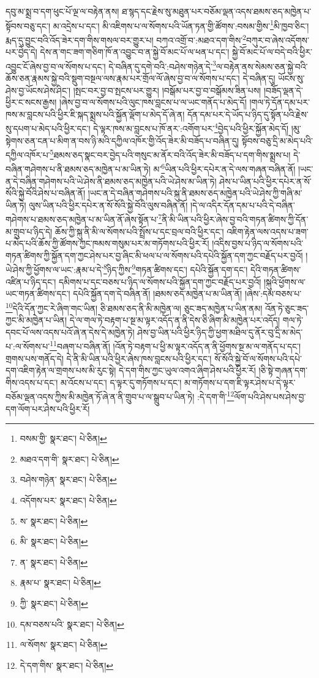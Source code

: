 དབུ་མ་སྨྲ་བ་དག་ཕུང་པོ་ལྔ་ལ་བརྟེན་ནས། ཐ་སྙད་དང་རྗེས་སུ་མཐུན་པར་བཅོམ་ལྡན་འདས་ཐམས་ཅད་མཁྱེན་པ་སྟོབས་བཅུ་དང་། མ་འདྲེས་པ་དང་། མི་འཇིགས་པ་ལ་སོགས་པའི་ཡོན་ཏན་གྱི་ཚོགས་:བསམ་གྱིས་\footnote{བསམ་གྱི་  སྣར་ཐང་།  པེ་ཅིན། }མི་ཁྱབ་ཅིང་། རྨད་དུ་བྱུང་བའི་འོད་ཟེར་དག་གིས་གསལ་བར་གྱུར་པ། བཀའ་འགྲོ་བ་:མཐའ་དག་གིས་\footnote{མཐའ་དག་གི་  སྣར་ཐང་།  པེ་ཅིན། }བཀུར་བ་ཞེས་འདོགས་པར་བྱེད་དེ། དེས་ན་གང་ཟག་གཅིག་ཁོ་ན་འབྱུང་བ་ན་སྐྱེ་བོ་མང་པོ་ལ་ཕན་པ་དང་། སྐྱེ་བོ་མང་པོ་ལ་བདེ་བའི་ཕྱིར་འབྱུང་ངོ་ཞེས་བྱ་བ་ལ་སོགས་པ་དང་། དེ་བཞིན་དུ་དགེ་བའི་:བཤེས་གཉེན་དེ་\footnote{བཤེས་གཉེན་  སྣར་ཐང་།  པེ་ཅིན། }ལ་བརྟེན་ནས་སེམས་ཅན་སྐྱེ་བའི་ཆོས་ཅན་རྣམས་སྐྱེ་བའི་སྡུག་བསྔལ་ལས་རྣམ་པར་གྲོལ་ལོ་ཞེས་བྱ་བ་ལ་སོགས་པ་དང་། དེ་བཞིན་དུ། ཡོངས་སུ་ཤེས་བྱ་ཡོངས་ཤེས་ཤིང་། །སྤང་བར་བྱ་བ་སྤངས་པར་གྱུར། །བསྒོམ་པར་བྱ་བ་བསྒོམས་ཟིན་པས། །བཟོད་ལྡན་དེ་ཕྱིར་ང་སངས་རྒྱས། །ཞེས་བྱ་བ་ལ་སོགས་པའི་ལུང་ཁས་བླངས་པ་ལ་ཡང་གནོད་པ་མེད་དོ། །གལ་ཏེ་དོན་དམ་པར་ཁས་མ་བླངས་པའི་ཕྱིར་ཇི་སྐད་སྨྲས་པའི་སྐྱོན་ལྡོག་པ་མེད་དོ་ཞེ་ན། དོན་དམ་པར་དེ་ཡོད་པ་ཉིད་དུ་སྟོན་པའི་རྗེས་སུ་དཔག་པ་མེད་པའི་ཕྱིར་དང་། དེ་ལྟར་ཁས་མ་བླངས་པ་ཁོ་ནར་:འགོག་པར་\footnote{འདོགས་པར་  སྣར་ཐང་།  པེ་ཅིན། }བྱེད་པའི་ཕྱིར་སྐྱོན་མེད་དོ། །མུ་སྟེགས་ཅན་ངན་པ་མིག་ན་བས་ཉི་མའི་དཀྱིལ་འཁོར་གྱི་འོད་ཟེར་མི་བཟོད་པ་བཞིན་དུ། སྟོབས་བཅུ་དྲི་མ་མེད་པའི་དཀྱིལ་འཁོར་པ་\footnote{ས་  སྣར་ཐང་།  པེ་ཅིན། }ཐམས་ཅད་སྣང་བར་བྱེད་པའི་གསུང་མ་ནོར་བའི་འོད་ཟེར་མི་བཟོད་པ་དག་གིས་སྨྲས་པ། དེ་བཞིན་གཤེགས་པ་ནི་ཐམས་ཅད་མཁྱེན་པ་མ་ཡིན་ཏེ། མ་\footnote{མི་  སྣར་ཐང་།  པེ་ཅིན། }ཡིན་པའི་ཕྱིར་དཔེར་ན་དེ་ལས་གཞན་བཞིན་ནོ། །ཡང་ན་དེ་བཞིན་གཤེགས་པའི་ཡེ་ཤེས་ནི་ཐམས་ཅད་མཁྱེན་པའི་ཡེ་ཤེས་མ་ཡིན་ཏེ། ཤེས་པ་ཡིན་པའི་ཕྱིར་དཔེར་ན་སོ་སོའི་སྐྱེ་བོའི་ཤེས་པ་བཞིན་ནོ། །ཡང་ན་དེ་བཞིན་གཤེགས་པའི་སྐུ་ནི་ཐམས་ཅད་མཁྱེན་པའི་ཡེ་ཤེས་ཀྱི་གཞི་མ་ཡིན་ཏེ། ལུས་ཡིན་པའི་ཕྱིར་དཔེར་ན་སོ་སོའི་སྐྱེ་བོའི་ལུས་བཞིན་ནོ། །དེ་ལ་འདིར་དོན་དམ་པ་པའི་དེ་བཞིན་གཤེགས་པ་ཐམས་ཅད་མཁྱེན་པ་མ་ཡིན་ནོ་ཞེས་སྟོན་པ་\footnote{ན་  སྣར་ཐང་།  པེ་ཅིན། }ནི་མི་ཡིན་པའི་ཕྱིར་ཞེས་བྱ་བའི་གཏན་ཚིགས་ཀྱི་དོན་མ་གྲུབ་པ་ཉིད་དེ། ཆོས་ཀྱི་སྐུ་ནི་མི་ལ་སོགས་པའི་སྤྲོས་པ་དང་བྲལ་བའི་ཕྱིར་དང་། འཇིག་རྟེན་ལས་འདས་པ་ཟག་པ་མེད་པའི་ཆོས་ཀྱི་ཚོགས་ཀྱང་ཁམས་གསུམ་པར་མ་གཏོགས་པའི་ཕྱིར་རོ། །འདིས་བྱས་པ་ཉིད་ལ་སོགས་པའི་གཏན་ཚིགས་ཀྱི་སྐྱོན་དག་ཀྱང་ཤེས་པར་བྱ་ཞིང་མི་ཕལ་པ་ལ་སོགས་པའི་དཔེའི་སྐྱོན་དག་ཀྱང་བརྗོད་པར་བྱའོ། །ཡེ་ཤེས་ཀྱི་ཕྱོགས་ལ་ཡང་:རྣམ་པ་དེ་\footnote{རྣམ་པ་  སྣར་ཐང་།  པེ་ཅིན། }ཉིད་ཀྱིས་\footnote{ཀྱི་  སྣར་ཐང་།  པེ་ཅིན། }གཏན་ཚིགས་དང་། དཔེའི་སྐྱོན་དག་དང་། དེའི་གཏན་ཚིགས་འཛིན་པ་ཉིད་དང་། དམིགས་པ་དང་བཅས་པ་ཉིད་ལ་སོགས་པའི་སྐྱོན་དག་ཀྱང་བརྗོད་པར་བྱའོ། །སྐུའི་ཕྱོགས་ལ་ཡང་གཏན་ཚིགས་དང་། དཔེའི་སྐྱོན་དག་དེ་བཞིན་ནོ། །ཐམས་ཅད་མཁྱེན་པ་མ་ཡིན་ནོ། །ཞེས་:དམ་བཅས་པ་\footnote{དམ་བཅས་པའི་  སྣར་ཐང་།  པེ་ཅིན། }དེའི་དོན་ཀྱང་རེ་ཞིག་གང་ཡིན། ཅི་ཐམས་ཅད་ནི་མི་མཁྱེན་ལ། ཅུང་ཟད་མཁྱེན་པ་ཡིན་ནམ། འོན་ཏེ་ཅུང་ཟད་ཀྱང་མི་མཁྱེན་པ་ཡིན། དེ་ལ་གལ་ཏེ་བརྟག་པ་སྔ་མ་ལྟར་འདོད་ན་ནི་དེས་ཅི་ཞིག་མི་མཁྱེན་པར་འདོད། གལ་ཏེ་དབང་པོ་ལས་འདས་པའོ་ཞེ་ན་དེས་དེ་མཁྱེན་ཏེ། ཤེས་བྱ་ཡིན་པའི་ཕྱིར་ཉིད་ཀྱི་ཕྱག་མཐིལ་དུ་ནོར་བུ་དྲི་མ་མེད་པ་:ལ་སོགས་པ་\footnote{ལ་སོགས་  སྣར་ཐང་།  པེ་ཅིན། }བཞག་པ་བཞིན་ནོ། །འོན་ཏེ་བརྟག་པ་ཕྱི་མ་ལྟར་འདོད་ན་ནི་ཕྱོགས་སྔ་མ་ལ་གནོད་པ་དང་། གྲགས་པས་གནོད་དེ། དེ་ནི་མི་ཡིན་པའི་ཕྱིར་ཞེས་ཁས་བླངས་པའི་ཕྱིར་དང་། སོ་སོའི་སྐྱེ་བོ་ལ་སོགས་པའི་དཔེ་དག་འཇིག་རྟེན་ལ་གྲགས་པས་མི་རུང་སྟེ། དེ་དག་གིས་ཀྱང་ཡུལ་འགའ་ཞིག་ཤེས་པའི་ཕྱིར་རོ། །ཅི་སྟེ་གཞན་དག་གིས་འདས་པ་དང་། མ་འོངས་པ་དང་། ད་ལྟར་དུ་གཏོགས་པ་དང་། མ་གཏོགས་པ་དག་ཇི་ལྟར་ཤེས་པ་དེ་ལྟར་བཅོམ་ལྡན་འདས་ཀྱིས་མི་མཁྱེན་ཏོ་ཞེ་ན་ནི་གྲུབ་པ་ལ་སྒྲུབ་པ་ཡིན་ཏེ། :དེ་དག་གི་\footnote{དེ་དག་གིས་  སྣར་ཐང་།  པེ་ཅིན། }ལོག་པའི་ཤེས་པས་ཤེས་བྱ་དག་ལོག་པར་ཤེས་པའི་ཕྱིར་རོ། 
